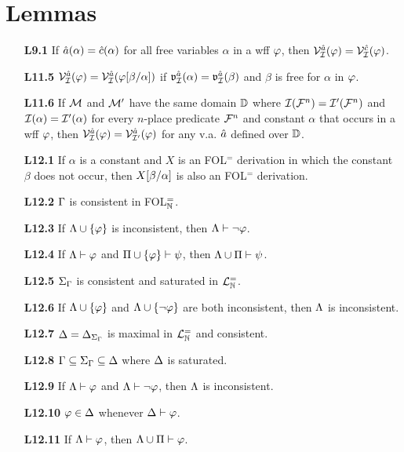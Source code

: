 \documentclass[a4paper, 11pt]{article} %
\begin{document}
\section*{Lemmas}

\begin{itemize}
  \item[\bf L9.1] If $\hat{a}(\alpha)=\hat{c}(\alpha)$ for all free variables $\alpha$ in a wff $\varphi$, then $\mathcal{V}_{\mathcal{I}}^{\hat{a}}(\varphi)=\mathcal{V}_{\mathcal{I}}^{\hat{c}}(\varphi)$.
  \item[\bf L11.5] $\mathcal{V}_{\mathcal{I}}^{\hat{a}}(\varphi)=\mathcal{V}_{\mathcal{I}}^{\hat{a}}(\varphi[\beta/\alpha])$ if $\mathfrak{v}_{\mathcal{I}}^{\hat{a}}(\alpha)=\mathfrak{v}_{\mathcal{I}}^{\hat{a}}(\beta)$ and $\beta$ is free for $\alpha$ in $\varphi$.
  \item[\bf L11.6] If $\mathcal{M}$ and $\mathcal{M}'$ have the same domain $\mathbb{D}$ where $\mathcal{I}(\mathcal{F}^n)=\mathcal{I}'(\mathcal{F}^n)$ and $\mathcal{I}(\alpha)=\mathcal{I}'(\alpha)$ for every $n$-place predicate $\mathcal{F}^n$ and constant $\alpha$ that occurs in a wff $\varphi$, then $\mathcal{V}_{\mathcal{I}}^{\hat{a}}(\varphi)=\mathcal{V}_{\mathcal{I}'}^{\hat{a}}(\varphi)$ for any v.a. $\hat{a}$ defined over $\mathbb{D}$.
  \item[\bf L12.1] If $\alpha$ is a constant and $X$ is an FOL$^=$ derivation in which the constant $\beta$ does not occur, then $X[\beta/\alpha]$ is also an FOL$^=$ derivation.
  \item[\bf L12.2] $\Gamma$ is consistent in FOL$^=_{\mathbb{N}}$.
  \item[\bf L12.3] If $\Lambda\cup\lbrace\varphi\rbrace$ is inconsistent, then $\Lambda\vdash\neg\varphi$.
  \item[\bf L12.4] If $\Lambda \vdash \varphi$ and $\Pi\cup\lbrace\varphi\rbrace \vdash \psi$, then $\Lambda\cup\Pi \vdash \psi$.
  \item[\bf L12.5] $\Sigma_{\Gamma}$ is consistent and saturated in $\mathcal{L}^{=}_{\mathbb{N}}$.
  \item[\bf L12.6] If $\Lambda \cup \lbrace\varphi\rbrace$ and $\Lambda\cup \lbrace\neg\varphi\rbrace$ are both inconsistent, then $\Lambda$ is inconsistent.
  \item[\bf L12.7] $\Delta=\Delta_{\Sigma_{\Gamma}}$ is maximal in $\mathcal{L}^{=}_{\mathbb{N}}$ and consistent. 
  \item[\bf L12.8] $\Gamma\subseteq\Sigma_{\Gamma}\subseteq\Delta$ where $\Delta$ is saturated.
  \item[\bf L12.9] If $\Lambda\vdash\varphi$ and $\Lambda\vdash\neg\varphi$, then $\Lambda$ is inconsistent.
  \item[\bf L12.10] $\varphi\in\Delta$ whenever $\Delta\vdash\varphi$.
  \item[\bf L12.11] If $\Lambda\vdash\varphi$, then $\Lambda\cup\Pi\vdash\varphi$.
\end{itemize}
\end{document}
